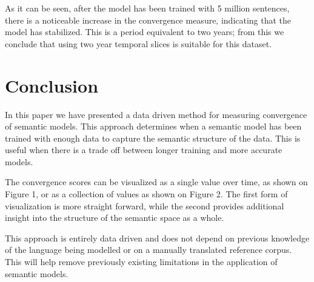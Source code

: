 \documentclass{article} %
\begin{document}
As it can be seen, after the model has been trained with 5 million sentences, there is a noticeable increase in the convergence measure, indicating that the model has stabilized. This is a period equivalent to two years; from this we conclude that using two year temporal slices is suitable for this dataset.

\section{Conclusion}
\label{sec:conclusion}
In this paper we have presented a data driven method for measuring convergence of semantic models. This approach determines when a semantic model has been trained with enough data to capture the semantic structure of the data. This is useful when there is a trade off between longer training and more accurate models.

The convergence scores can be visualized as a single value over time, as shown on Figure 1, or as a collection of values as shown on Figure 2. The first form of visualization is more straight forward, while the second provides additional insight into the structure of the semantic space as a whole.

This approach is entirely data driven and does not depend on previous knowledge of the language being modelled or on a manually translated reference corpus. This will help remove previously existing limitations in the application of semantic models.
\end{document}
